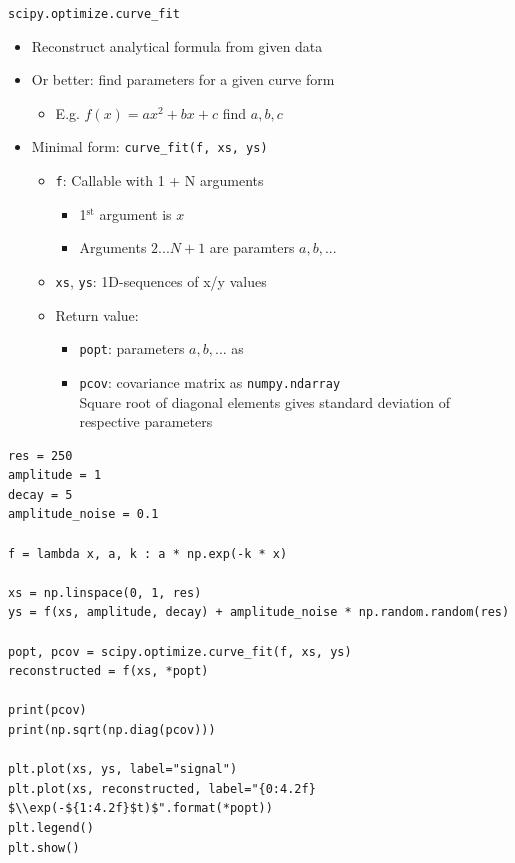 \begin{frame}{\texttt{scipy.optimize.curve\_fit}}
%
\begin{itemize}
\item Reconstruct analytical formula from given data
\item Or better: find parameters for a given curve form
	\begin{itemize}
	\item E.\;g. $f(x) = ax^2 + bx + c$ \Thus find $a, b, c$
	\end{itemize}
\item Minimal form: \texttt{curve\_fit(f, xs, ys)}
	\begin{itemize}
	\item \texttt{f}: Callable with 1 + N arguments
		\begin{itemize}
		\item 1$^{\text{st}}$ argument is $x$
		\item Arguments $2 ... N+1$ are paramters $a, b, ...$
		\end{itemize}
	\item \texttt{xs}, \texttt{ys}: 1D-sequences of x/y values
	\item Return value: 
		\begin{itemize}
		\item \texttt{popt}: parameters $a, b, ...$ as 
		\item \texttt{pcov}: covariance matrix as \texttt{numpy.ndarray}\\
			Square root of diagonal elements gives standard deviation of respective parameters
		\end{itemize}
	\end{itemize}
\end{itemize}
%
\end{frame}


\begin{frame}[fragile]
%
\begin{codebox}
\begin{verbatim}
res = 250
amplitude = 1
decay = 5
amplitude_noise = 0.1

f = lambda x, a, k : a * np.exp(-k * x)

xs = np.linspace(0, 1, res)
ys = f(xs, amplitude, decay) + amplitude_noise * np.random.random(res)

popt, pcov = scipy.optimize.curve_fit(f, xs, ys)
reconstructed = f(xs, *popt)

print(pcov)
print(np.sqrt(np.diag(pcov)))

plt.plot(xs, ys, label="signal")
plt.plot(xs, reconstructed, label="{0:4.2f} $\\exp(-${1:4.2f}$t)$".format(*popt))
plt.legend()
plt.show()
\end{verbatim}
\end{codebox}
%
\end{frame}

